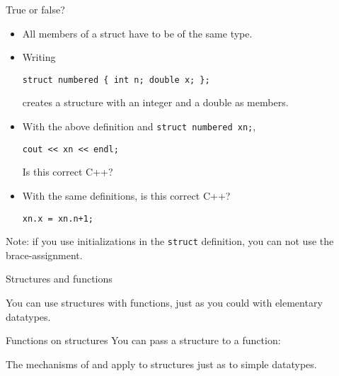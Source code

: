 \begin{review}
  \label{rev:func-def}
  True or false?
  \begin{itemize}
  \item All members of a struct have to be of the same type.
  \item Writing
\begin{lstlisting}
struct numbered { int n; double x; };
\end{lstlisting}
creates a structure with an integer and a double as members.
\item With the above definition and \lstinline$struct numbered xn;$,
\begin{lstlisting}
cout << xn << endl;
\end{lstlisting}
Is this correct C++?
\item With the same definitions, is this correct C++?
\begin{lstlisting}
xn.x = xn.n+1;
\end{lstlisting}
  \end{itemize}
\end{review}

Note: if you use initializations in the \lstinline$struct$ definition,
you can not use the brace-assignment.

 {Structures and functions}

You can use structures with functions, just as you could with
elementary datatypes.

\begin{block}{Functions on structures}
  \label{sl:struct-pass}
  You can pass a structure to a function:
\end{block}


The mechanisms of  and
 apply to structures just as
to simple datatypes.

